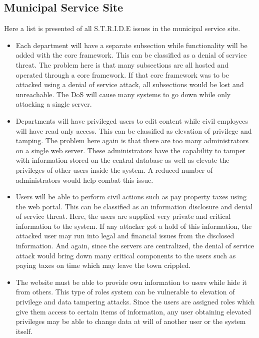 \documentclass[paper=a4, fontsize=11pt]{scrartcl} %
\numberwithin{equation}{section} %
\numberwithin{figure}{section} %
\numberwithin{table}{section} %
\begin{document}
\subsection{Municipal Service Site}
Here a list is presented of all S.T.R.I.D.E issues in the municipal service site.

\begin{itemize}
\item Each department will have a separate subsection while functionality will be added with the core framework. This can
be classified as a denial of service threat. The problem here is that many subsections are all hosted and operated through
a core framework. If that core framework was to be attacked using a denial of service attack, all subsections would be lost
and unreachable. The DoS will cause many systems to go down while only attacking a single server.
\item Departments will have privileged users to edit content while civil employees will have read only access. This can be
classified as elevation of privilege and tamping. The problem here again is that there are too many administrators on a single
web server. These administrators have the capability to tamper with information stored on the central database as well as
elevate the privileges of other users inside the system. A reduced number of administrators would help combat this issue.
\item Users will be able to perform civil actions such as pay property taxes using the web portal. This can be classified as
an information disclosure and denial of service threat. Here, the users are supplied very private and critical information
to the system. If any attacker got a hold of this information, the attacked user may run into legal and financial issues from
the disclosed information. And again, since the servers are centralized, the denial of service attack would bring down many
critical components to the users such as paying taxes on time which may leave the town crippled.
\item The website must be able to provide own information to users while hide it from others. This type of roles system 
can be vulnerable to elevation of privilege and data tampering attacks. Since the users are assigned roles which give them
access to certain items of information, any user obtaining elevated privileges may be able to change data at will of another
user or the system itself.
\end{itemize}

\end{document}
